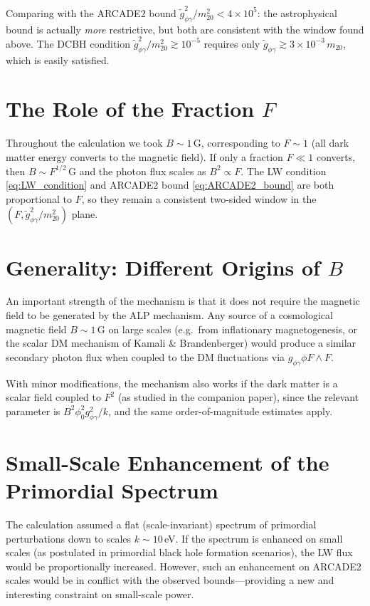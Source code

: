\documentclass[12pt,a4paper]{report}
\newcommand{\gag}{g_{\phi\gamma}}
\newcommand{\gtag}{\tilde{g}_{\phi\gamma}}
\newcommand{\phizero}{\phi_0}
\theoremstyle{definition}
\begin{document}
Comparing with the ARCADE2 bound $\gtag^2/m_{20}^2 < 4\times10^5$: the astrophysical
bound is actually \emph{more} restrictive, but both are consistent with the window
found above. The DCBH condition $\gtag^2/m_{20}^2\gtrsim 10^{-5}$ requires only
$\gtag\gtrsim 3\times10^{-3}\,m_{20}$, which is easily satisfied.

\section{The Role of the Fraction $F$}

Throughout the calculation we took $B\sim 1\,\mathrm{G}$, corresponding to $F\sim 1$
(all dark matter energy converts to the magnetic field). If only a fraction $F\ll 1$
converts, then $B\sim F^{1/2}$\,G and the photon flux scales as $B^2\propto F$.
The LW condition \eqref{eq:LW_condition} and ARCADE2 bound \eqref{eq:ARCADE2_bound}
are both proportional to $F$, so they remain a consistent two-sided window in the
$(F, \gtag^2/m_{20}^2)$ plane.

\section{Generality: Different Origins of $B$}

An important strength of the mechanism is that it does not require the magnetic field
to be generated by the ALP mechanism. Any source of a cosmological magnetic field
$B\sim 1\,\mathrm{G}$ on large scales (e.g.\ from inflationary magnetogenesis, or the
scalar DM mechanism of Kamali \& Brandenberger) would produce a similar secondary
photon flux when coupled to the DM fluctuations via $\gag\phi F\wedge F$.

With minor modifications, the mechanism also works if the dark matter is a scalar
field coupled to $F^2$ (as studied in the companion paper), since the relevant
parameter is $B^2\phizero^2\gag^2/k$, and the same order-of-magnitude estimates apply.

\section{Small-Scale Enhancement of the Primordial Spectrum}

The calculation assumed a flat (scale-invariant) spectrum of primordial perturbations
down to scales $k\sim 10$\,eV. If the spectrum is enhanced on small scales (as
postulated in primordial black hole formation scenarios), the LW flux would be
proportionally increased. However, such an enhancement on ARCADE2 scales would be
in conflict with the observed bounds---providing a new and interesting constraint on
small-scale power.
\end{document}
